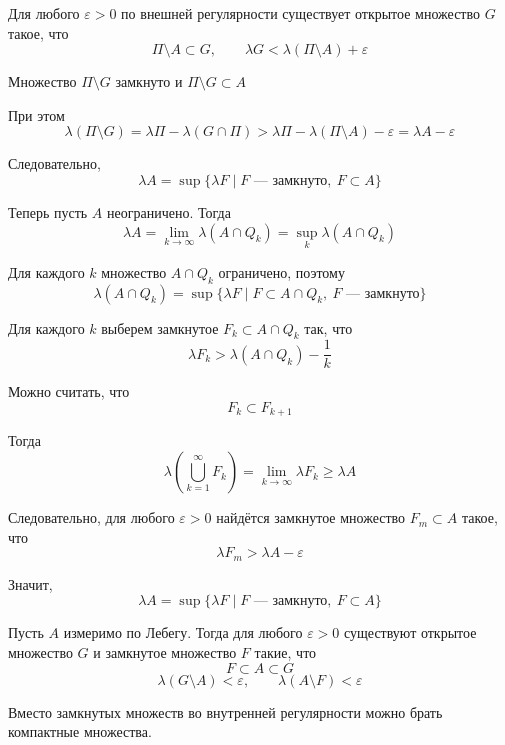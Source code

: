 \documentclass[12pt,a4paper]{article}
\begin{document}
\begin{proofbox}{}
    Для любого $\varepsilon>0$ по внешней регулярности существует открытое множество $G$ такое, что
    \[
        \Pi\setminus A\subset G,
        \qquad
        \lambda G<\lambda(\Pi\setminus A)+\varepsilon
    \]

    Множество $\Pi\setminus G$ замкнуто и $\Pi\setminus G\subset A$

    При этом
    \[
        \lambda(\Pi\setminus G)
        =
        \lambda\Pi-\lambda(G\cap\Pi)
        >
        \lambda\Pi-\lambda(\Pi\setminus A)-\varepsilon
        =
        \lambda A-\varepsilon
    \]

    Следовательно,
    \[
        \lambda A
        =
        \sup\{\lambda F\mid F\text{ --- замкнуто},\ F\subset A\}
    \]

    Теперь пусть $A$ неограничено. Тогда
    \[
        \lambda A
        =
        \lim_{k\to\infty}\lambda(A\cap Q_k)
        =
        \sup_k\lambda(A\cap Q_k)
    \]

    Для каждого $k$ множество $A\cap Q_k$ ограничено, поэтому
    \[
        \lambda(A\cap Q_k)
        =
        \sup\{\lambda F\mid F\subset A\cap Q_k,\ F\text{ --- замкнуто}\}
    \]

    Для каждого $k$ выберем замкнутое $F_k\subset A\cap Q_k$ так, что
    \[
        \lambda F_k>\lambda(A\cap Q_k)-\frac{1}{k}
    \]

    Можно считать, что
    \[
    F_k\subset F_{k+1}
    \]

    Тогда
    \[
    \lambda\left(\bigcup_{k=1}^{\infty}F_k\right)
    =
    \lim_{k\to\infty}\lambda F_k
    \geq \lambda A
    \]

    Следовательно, для любого $\varepsilon>0$ найдётся замкнутое множество $F_m\subset A$ такое, что
    \[
    \lambda F_m>\lambda A-\varepsilon
    \]

    Значит,
    \[
        \lambda A
        =
        \sup\{\lambda F\mid F\text{ --- замкнуто},\ F\subset A\}
    \]
\end{proofbox}

\begin{props}{}
    Пусть $A$ измеримо по Лебегу. Тогда для любого $\varepsilon>0$ существуют открытое множество $G$ и замкнутое множество $F$ такие, что
    \[
        F\subset A\subset G
    \]
    \[
        \lambda(G\setminus A)<\varepsilon,
        \qquad
        \lambda(A\setminus F)<\varepsilon
    \]
\end{props}

\begin{note}
    Вместо замкнутых множеств во внутренней регулярности можно брать компактные множества.
\end{note}
\end{document}
